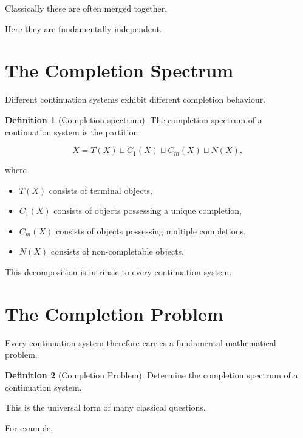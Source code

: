 \documentclass[13pt,openany]{book}
\theoremstyle{plain}
\theoremstyle{definition}
\newtheorem{definition}{Definition}[chapter]
\begin{document}
Classically these are often merged together.

Here they are fundamentally independent.


\section{The Completion Spectrum}

Different continuation systems exhibit different completion behaviour.

\begin{definition}[Completion spectrum]
The completion spectrum of a continuation system is the partition

\[
X
=
T(X)
\sqcup
C_1(X)
\sqcup
C_m(X)
\sqcup
N(X),
\]

where

\begin{itemize}
\item $T(X)$ consists of terminal objects,

\item $C_1(X)$ consists of objects possessing a unique completion,

\item $C_m(X)$ consists of objects possessing multiple completions,

\item $N(X)$ consists of non-completable objects.
\end{itemize}
\end{definition}

This decomposition is intrinsic to every continuation system.


\section{The Completion Problem}

Every continuation system therefore carries a fundamental mathematical problem.

\begin{definition}[Completion Problem]
Determine the completion spectrum of a continuation system.
\end{definition}

This is the universal form of many classical questions.

For example,
\end{document}

